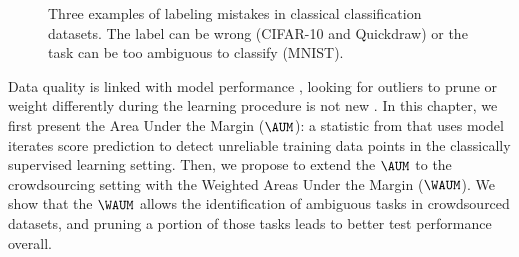 \begin{figure}[thb]
\begin{minipage}{.3\linewidth}
\end{minipage}%
\hfill
\begin{minipage}{.3\linewidth}
\centering
{}
\end{minipage}
\caption{Three examples of labeling mistakes in classical classification datasets. The label can be wrong (CIFAR-10 and Quickdraw) or the task can be too ambiguous to classify (MNIST).}
\label{fig:label_mistakes}
\end{figure}


Data quality is linked with model performance \citep{budach2022effects}, looking for outliers to prune or weight differently during the learning procedure is not new \citep{angelova2004data}.
In this chapter, we first present the Area Under the Margin ($\AUM$): a statistic from \citet{pleiss_identifying_2020} that uses model iterates score prediction to detect unreliable training data points in the classically supervised learning setting.
Then, we propose to extend the $\AUM$ to the crowdsourcing setting with the Weighted Areas Under the Margin ($\WAUM$).
We show that the $\WAUM$ allows the identification of ambiguous tasks in crowdsourced datasets, and pruning a portion of those tasks leads to better test performance overall.

